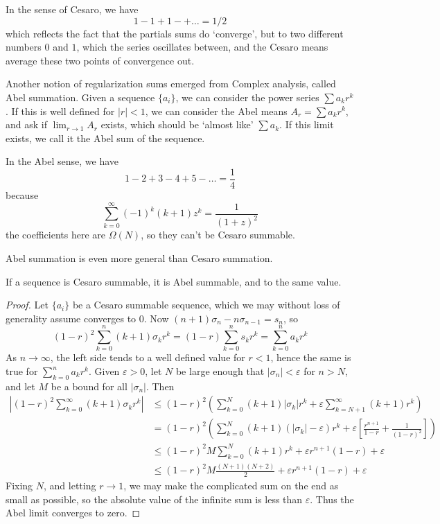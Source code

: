 \begin{example}
In the sense of Cesaro, we have
%
\[ 1 - 1 + 1 - + \dots = 1/2 \]
%
which reflects the fact that the partials sums do `converge', but to two different numbers $0$ and $1$, which the series oscillates between, and the Cesaro means average these two points of convergence out.
\end{example}

Another notion of regularization sums emerged from Complex analysis, called Abel summation. Given a sequence $\{ a_i \}$, we can consider the power series $\sum a_k r^k$. If this is well defined for $|r| < 1$, we can consider the Abel means $A_r = \sum a_k r^k$, and ask if $\lim_{r \to 1} A_r$ exists, which should be `almost like' $\sum a_k$. If this limit exists, we call it the Abel sum of the sequence.

\begin{example}
    In the Abel sense, we have
    \[ 1 - 2 + 3 - 4 + 5 - \dots = \frac{1}{4} \]
    because
    \[ \sum_{k = 0}^\infty (-1)^k (k + 1) z^k = \frac{1}{(1 + z)^2} \]
    the coefficients here are $\Omega(N)$, so they can't be Cesaro summable.
\end{example}

Abel summation is even more general than Cesaro summation.

\begin{theorem}
    If a sequence is Cesaro summable, it is Abel summable, and to the same value.
\end{theorem}
\begin{proof}
    Let $\{ a_i \}$ be a Cesaro summable sequence, which we may without loss of generality assume converges to $0$. Now $(n + 1)\sigma_n - n \sigma_{n-1} = s_n$, so
    \[ (1 - r)^2 \sum_{k = 0}^n (k + 1) \sigma_k r^k = (1 - r) \sum_{k = 0}^n s_k r^k = \sum_{k = 0}^n a_k r^k \]
    As $n \to \infty$, the left side tends to a well defined value for $r < 1$, hence the same is true for $\sum_{k = 0}^n a_k r^k$. Given $\varepsilon > 0$, let $N$ be large enough that $|\sigma_n| < \varepsilon$ for $n > N$, and let $M$ be a bound for all $|\sigma_n|$. Then
    \begin{align*}
        \left| (1 - r)^2 \sum_{k = 0}^\infty (k + 1) \sigma_k r^k \right| &\leq (1 - r)^2 \left( \sum_{k = 0}^N (k + 1) |\sigma_k| r^k + \varepsilon \sum_{k = N+1}^\infty (k + 1) r^k \right)\\
        &= (1 - r)^2 \left( \sum_{k = 0}^N (k + 1) (|\sigma_k| - \varepsilon) r^k + \varepsilon \left[ \frac{r^{n+1}}{1-r} + \frac{1}{(1 - r)^2} \right] \right)\\
        &\leq (1 - r)^2 M \sum_{k = 0}^N (k + 1) r^k + \varepsilon r^{n+1} (1 - r) + \varepsilon\\
        &\leq (1 - r)^2 M \frac{(N+1)(N+2)}{2} + \varepsilon r^{n+1} (1 - r) + \varepsilon
    \end{align*}
    Fixing $N$, and letting $r \to 1$, we may make the complicated sum on the end as small as possible, so the absolute value of the infinite sum is less than $\varepsilon$. Thus the Abel limit converges to zero.
\end{proof}

